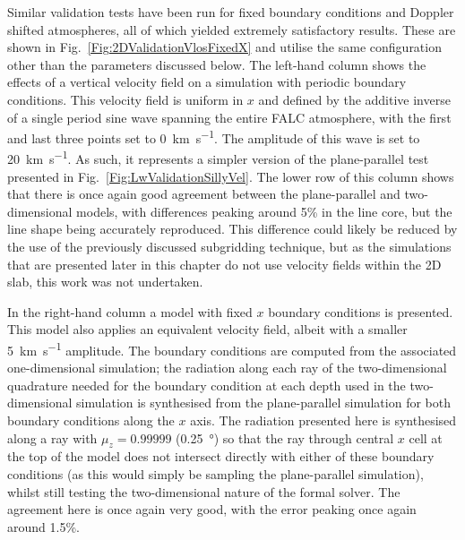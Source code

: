 Similar validation tests have been run for fixed boundary conditions and Doppler shifted atmospheres, all of which yielded extremely satisfactory results.
These are shown in Fig.~\ref{Fig:2DValidationVlosFixedX} and utilise the same configuration other than the parameters discussed below.
The left-hand column shows the effects of a vertical velocity field on a simulation with periodic boundary conditions.
This velocity field is uniform in $x$ and defined by the additive inverse of a single period sine wave spanning the entire FALC atmosphere, with the first and last three points set to \SI{0}{\kilo\metre\per\second}.
The amplitude of this wave is set to \SI{20}{\kilo\metre\per\second}.
As such, it represents a simpler version of the plane-parallel test presented in Fig.~\ref{Fig:LwValidationSillyVel}.
The lower row of this column shows that there is once again good agreement between the plane-parallel and two-dimensional models, with differences peaking around 5\% in the line core, but the line shape being accurately reproduced.
This difference could likely be reduced by the use of the previously discussed subgridding technique, but as the simulations that are presented later in this chapter do not use velocity fields within the 2D slab, this work was not undertaken.

In the right-hand column a model with fixed $x$ boundary conditions is presented.
This model also applies an equivalent velocity field, albeit with a smaller \SI{5}{\kilo\metre\per\second} amplitude.
The boundary conditions are computed from the associated one-dimensional simulation; the radiation along each ray of the two-dimensional quadrature needed for the boundary condition at each depth used in the two-dimensional simulation is synthesised from the plane-parallel simulation for both boundary conditions along the $x$ axis.
The radiation presented here is synthesised along a ray with $\mu_z=0.99999$ (\SI{0.25}{\degree}) so that the ray through central $x$ cell at the top of the model does not intersect directly with either of these boundary conditions (as this would simply be sampling the plane-parallel simulation), whilst still testing the two-dimensional nature of the formal solver.
The agreement here is once again very good, with the error peaking once again around 1.5\%.

